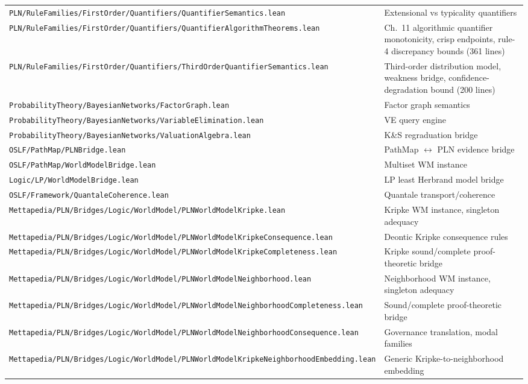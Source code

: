 \documentclass[]{article}
\newcommand{\code}[1]{\texttt{#1}}
\begin{document}
\begin{longtable}{p{}p{}}
\code{PLN/RuleFamilies/FirstOrder/Quantifiers/QuantifierSemantics.lean} & Extensional vs
  typicality quantifiers \\
\code{PLN/RuleFamilies/FirstOrder/Quantifiers/QuantifierAlgorithmTheorems.lean} &
  Ch.~11 algorithmic quantifier monotonicity, crisp endpoints, rule-4
  discrepancy bounds (361 lines) \\
\code{PLN/RuleFamilies/FirstOrder/Quantifiers/ThirdOrderQuantifierSemantics.lean} &
  Third-order distribution model, weakness bridge,
  confidence-degradation bound (200 lines) \\
\code{ProbabilityTheory/BayesianNetworks/FactorGraph.lean} & Factor graph
  semantics \\
\code{ProbabilityTheory/BayesianNetworks/VariableElimination.lean} & VE
  query engine \\
\code{ProbabilityTheory/BayesianNetworks/ValuationAlgebra.lean} &
  K\&S regraduation bridge \\
\code{OSLF/PathMap/PLNBridge.lean} & PathMap $\leftrightarrow$ PLN
  evidence bridge \\
\code{OSLF/PathMap/WorldModelBridge.lean} & Multiset WM instance \\
\code{Logic/LP/WorldModelBridge.lean} & LP least Herbrand model bridge \\
\code{OSLF/Framework/QuantaleCoherence.lean} & Quantale
  transport/coherence \\
\code{Mettapedia/PLN/Bridges/Logic/WorldModel/PLNWorldModelKripke.lean} & Kripke WM instance,
  singleton adequacy \\
\code{Mettapedia/PLN/Bridges/Logic/WorldModel/PLNWorldModelKripkeConsequence.lean} & Deontic Kripke
  consequence rules \\
\code{Mettapedia/PLN/Bridges/Logic/WorldModel/PLNWorldModelKripkeCompleteness.lean} & Kripke
  sound/complete proof-theoretic bridge \\
\code{Mettapedia/PLN/Bridges/Logic/WorldModel/PLNWorldModelNeighborhood.lean} & Neighborhood WM instance,
  singleton adequacy \\
\code{Mettapedia/PLN/Bridges/Logic/WorldModel/PLNWorldModelNeighborhoodCompleteness.lean} &
  Sound/complete proof-theoretic bridge \\
\code{Mettapedia/PLN/Bridges/Logic/WorldModel/PLNWorldModelNeighborhoodConsequence.lean} & Governance
  translation, modal families \\
\code{Mettapedia/PLN/Bridges/Logic/WorldModel/PLNWorldModelKripkeNeighborhoodEmbedding.lean} &
  Generic Kripke-to-neighborhood embedding \\

\end{longtable}
\end{document}
